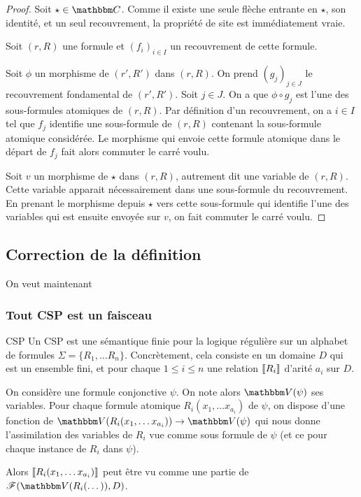 \begin{proof}
    Soit $\star\in\C$. Comme il existe une seule flèche entrante en $\star$, son identité,
    et un seul recouvrement, la propriété de site est immédiatement vraie.

    Soit $(r,R)$ une formule et $(f_i)_{i\in I}$ un recouvrement de cette formule.
    
    Soit $\phi$ un morphisme de $(r', R')$ dans $(r,R)$. On prend $(g_j)_{j\in J}$ le
    recouvrement fondamental de $(r', R')$. Soit $j\in J$. On a que $\phi\circ g_j$ est
    l'une des sous-formules atomiques de $(r,R)$. Par définition d'un recouvrement, on
    a $i\in I$ tel que $f_j$ identifie une sous-formule de $(r,R)$ contenant la
    sous-formule atomique considérée. Le morphisme qui envoie cette formule atomique
    dans le départ de $f_j$ fait alors commuter le carré voulu.

    Soit $v$ un morphisme de $\star$ dans $(r,R)$, autrement dit une variable de $(r,R)$.
    Cette variable apparait nécessairement dans une sous-formule du recouvrement. En
    prenant le morphisme depuis $\star$ vers cette sous-formule qui identifie l'une des
    variables qui est ensuite envoyée sur $v$, on fait commuter le carré voulu.
\end{proof}

\subsection{Correction de la définition}

On veut maintenant

\subsubsection{Tout CSP est un faisceau}

\begin{defi}{CSP}
    Un CSP est une sémantique finie pour la logique régulière sur un alphabet de formules 
    $\Sigma = \{R_1, \dots R_n\}$. Concrètement, cela consiste en un domaine $D$ qui est
    un ensemble fini, et pour chaque $1\leq i\leq n$ une relation $\llbracket {R_i} \rrbracket$
    d'arité $a_i$ sur $D$.
\end{defi}

\begin{rem}
    On considère une formule conjonctive $\psi$. On note alors $\V(\psi)$ ses variables.
    Pour chaque formule atomique $R_i(x_1, \dots x_{a_i})$ de $\psi$, on dispose
    d'une fonction de $\V(R_i(x_1, \dots x_{a_i}))\rightarrow\V(\psi)$
    qui nous donne l'assimilation des variables de $R_i$ vue comme sous formule de
    $\psi$ (et ce pour chaque instance de $R_i$ dans $\psi$).

    Alors $\llbracket {R_i(x_1, \dots x_{a_i})} \rrbracket$ peut être vu comme une partie de
    $\fns(\V(R_i(\dots)), D)$.
\end{rem}

